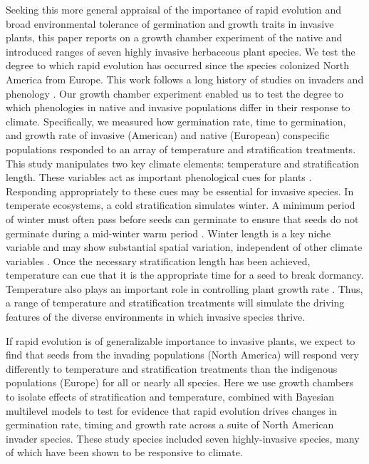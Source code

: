 \documentclass[12pt]{article}\usepackage[]{graphicx}\usepackage[]{color}
\begin{document}
	Seeking this more general appraisal of the importance of rapid evolution and broad environmental tolerance of germination and growth traits in invasive plants, this paper reports on a growth chamber experiment of the native and introduced ranges of seven highly invasive herbaceous plant species. We test the degree to which rapid evolution has occurred since the species colonized North America from Europe.  This work follows a long history of studies on invaders and phenology \parencite{Wolkovich2014}. Our growth chamber experiment enabled us to test the degree to which phenologies in native and invasive populations differ in their response to climate.   Specifically, we measured how germination rate, time to germination, and growth rate of invasive (American) and native (European) conspecific populations responded to an array of temperature and stratification treatments.
	This study manipulates two key climate elements: temperature and stratification length. These variables act as important phenological cues for plants \parencite{Finch2006}. Responding appropriately to these cues may be essential for invasive species. In temperate ecosystems, a cold stratification simulates winter. A minimum period of winter must often pass before seeds can germinate to ensure that seeds do not germinate during a mid-winter warm period \parencite{Baskin1998,Popay1970,Wulff1994}. Winter length is a key niche variable \parencite{Harte2015} and may show substantial spatial variation, independent of other climate variables \parencite{Bonan2003}.  Once the necessary stratification length has been achieved, temperature can cue that it is the appropriate time for a seed to break dormancy. Temperature also plays an important role in controlling plant growth rate \parencite{Egli1980,Guilioni2003}. Thus, a range of temperature and stratification treatments will simulate the driving features of the diverse environments in which invasive species thrive. 
	

	 If rapid evolution is of generalizable importance to invasive plants, we expect to find that seeds from the invading populations (North America) will respond very differently to temperature and stratification treatments than the indigenous populations (Europe) for all or nearly all species. Here we use growth chambers to isolate effects of stratification and temperature, combined with Bayesian multilevel models to test for evidence that rapid evolution drives changes in germination rate, timing and growth rate across a suite of North American invader species.   These study species included seven highly-invasive species, many of which have been shown to be responsive to climate. %
\end{document}

